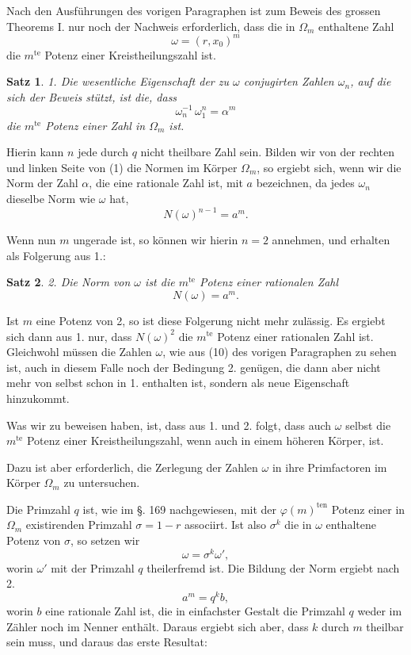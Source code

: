 \documentclass[12pt,a4paper]{article}
\newtheorem*{satz}{Satz}
\begin{document}
Nach den Ausführungen des vorigen Paragraphen ist zum Beweis des grossen Theorems I. nur noch der Nachweis erforderlich, dass die in $\Omega_m$ enthaltene Zahl
\[
\omega = (r, x_0)^m
\]
die $m^{\text{te}}$ Potenz einer Kreistheilungszahl ist.

\begin{satz}
1. Die wesentliche Eigenschaft der zu $\omega$ conjugirten Zahlen $\omega_n$, auf die sich der Beweis stützt, ist die, dass
\begin{equation}\label{eq:181-1}
\omega_n^{-1}\,\omega_1^n = \alpha^m
\end{equation}
die $m^{\text{te}}$ Potenz einer Zahl in $\Omega_m$ ist.
\end{satz}

Hierin kann $n$ jede durch $q$ nicht theilbare Zahl sein. Bilden wir von der rechten und linken Seite von (1) die Normen im Körper $\Omega_m$, so ergiebt sich, wenn wir die Norm der Zahl $\alpha$, die eine rationale Zahl ist, mit $a$ bezeichnen, da jedes $\omega_n$ dieselbe Norm wie $\omega$ hat,
\[
N(\omega)^{n-1} = a^m.
\]

Wenn nun $m$ ungerade ist, so können wir hierin $n = 2$ annehmen, und erhalten als Folgerung aus 1.:

\begin{satz}
2. Die Norm von $\omega$ ist die $m^{\text{te}}$ Potenz einer rationalen Zahl
\begin{equation}\label{eq:181-2}
N(\omega) = a^m.
\end{equation}
\end{satz}

Ist $m$ eine Potenz von 2, so ist diese Folgerung nicht mehr zulässig. Es ergiebt sich dann aus 1. nur, dass $N(\omega)^2$ die $m^{\text{te}}$ Potenz einer rationalen Zahl ist. Gleichwohl müssen die Zahlen $\omega$, wie aus (10) des vorigen Paragraphen zu sehen ist, auch in diesem Falle noch der Bedingung 2. genügen, die dann aber nicht mehr von selbst schon in 1. enthalten ist, sondern als neue Eigenschaft hinzukommt.

Was wir zu beweisen haben, ist, dass aus 1. und 2. folgt, dass auch $\omega$ selbst die $m^{\text{te}}$ Potenz einer Kreistheilungszahl, wenn auch in einem höheren Körper, ist.

Dazu ist aber erforderlich, die Zerlegung der Zahlen $\omega$ in ihre Primfactoren im Körper $\Omega_m$ zu untersuchen.

Die Primzahl $q$ ist, wie im \S. 169 nachgewiesen, mit der $\varphi(m)^{\text{ten}}$ Potenz einer in $\Omega_m$ existirenden Primzahl $\sigma = 1 - r$ associirt. Ist also $\sigma^k$ die in $\omega$ enthaltene Potenz von $\sigma$, so setzen wir
\[
\omega = \sigma^k \omega',
\]
worin $\omega'$ mit der Primzahl $q$ theilerfremd ist. Die Bildung der Norm ergiebt nach 2.
\[
a^m = q^k b,
\]
worin $b$ eine rationale Zahl ist, die in einfachster Gestalt die Primzahl $q$ weder im Zähler noch im Nenner enthält. Daraus ergiebt sich aber, dass $k$ durch $m$ theilbar sein muss, und daraus das erste Resultat:
\end{document}
